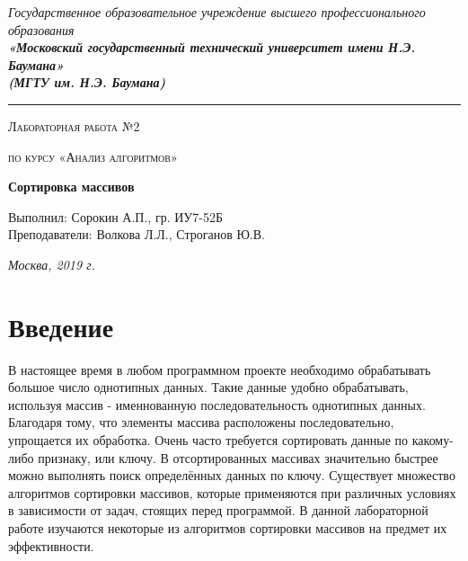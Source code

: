 \documentclass[12pt, a4paper]{report}
\begin{document}
    \begin{titlepage}

        \begin{center}
            \Large
            {\sl Государственное образовательное учреждение высшего профессионального образования\\
            {\bf«Московский государственный технический университет имени Н.Э. Баумана»\\
				(МГТУ им. Н.Э. Баумана)}}
				\noindent\rule{\textwidth}{2pt}
            \vspace{3cm}

			{\scshape\LARGE Лабораторная работа №2 \par}
			\vspace{0.5cm}	
			{\scshape\LARGE по курсу «Анализ алгоритмов» \par}
			\vspace{1.5cm}
			{\huge\bfseries Сортировка массивов \par}
			\vspace{2cm}
			\Large Выполнил: Сорокин А.П., гр. ИУ7-52Б\\
			\vspace{0.5cm}
			{\Large Преподаватели: Волкова Л.Л., Строганов Ю.В.}
		
			\vfill
			\Large \textit {Москва, 2019 г.}
            
        \end{center}

    \end{titlepage}
	
	\tableofcontents

	\chapter*{Введение}
	
	В настоящее время в любом программном проекте необходимо обрабатывать большое число однотипных данных. Такие данные удобно обрабатывать, используя массив - именнованную последовательность однотипных данных. Благодаря тому, что элементы массива расположены последовательно, упрощается их обработка.
	Очень часто требуется сортировать данные по какому-либо признаку, или ключу. В отсортированных массивах значительно быстрее можно выполнять поиск определённых данных по ключу. Существует множество алгоритмов сортировки массивов, которые применяются при различных условиях в зависимости от задач, стоящих перед программой. В данной лабораторной работе изучаются некоторые из алгоритмов сортировки массивов на предмет их эффективности.
	
\end{document}
